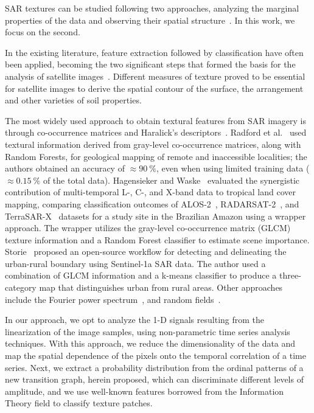 \documentclass[journal]{IEEEtran}
\begin{document}
SAR textures can be studied following two approaches, analyzing the marginal properties of the data and observing their spatial structure~\cite{AGeneralizedGaussianCoherentScattererModelforCorrelatedSARTexture,numbisi2018multi}.
In this work, we focus on the second.

In the existing literature, feature extraction followed by classification have often been applied, becoming the two significant steps that formed the basis for the analysis of satellite images~\cite{feng2014amplitude}.
Different measures of texture proved to be essential for satellite images to derive the spatial contour of the surface, the arrangement and other varieties of soil properties.

The most widely used approach to obtain textural features from SAR imagery is through co-occurrence matrices and Haralick's descriptors~\cite{yu2019detection}.
Radford et al.~\cite{radford2018geological} used textural information derived from gray-level co-occurrence matrices, along with Random Forests, for geological mapping of remote and inaccessible localities; the authors obtained an accuracy of $\approx\SI{90}{\percent}$, even when using limited training data ($\approx\SI{0.15}{\percent}$ of the total data). 
%
Hagensieker and Waske~\cite{hagensieker2018evaluation} evaluated the synergistic contribution of multi-temporal L-, C-, and X-band data to tropical land cover mapping, comparing classification outcomes of ALOS-2~\cite{kankaku2013alos}, RADARSAT-2~\cite{morena2004introduction}, and TerraSAR-X~\cite{breit2009terrasar} 
datasets for a study site in the Brazilian Amazon using a wrapper approach. 
The wrapper utilizes the gray-level co-occurrence matrix (GLCM)
texture information and a  Random Forest classifier to estimate scene importance. 
%
Storie~\cite{storie2018urban} proposed an open-source workflow for detecting and delineating the urban-rural boundary using Sentinel-1a SAR data.
The author used a combination of GLCM information and a k-means classifier to produce a three-category map that distinguishes urban from rural areas. 
Other approaches include the Fourier power  spectrum~\cite{Florindo2012Fractal}, and random fields~\cite{zhu2016antarctic}.

In our approach, we opt to analyze the 1-D signals resulting from the linearization of the image samples, using non-parametric time series analysis techniques.
With this approach, we reduce the dimensionality of the data and map the spatial dependence of the pixels onto the temporal correlation of a time series.
Next, we extract a probability distribution from the ordinal patterns of a new transition graph, herein proposed, which can discriminate different levels of amplitude, and we use well-known features borrowed from the Information Theory field to classify texture patches.
	
\end{document}
